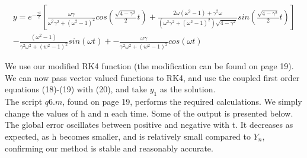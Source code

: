 \documentclass[10pt,a4paper]{report}
\begin{document}
\begin{multline*}
y = e^{-\frac{\gamma t}{2}}\left[\frac{\omega\gamma}{\omega^2\gamma^2+(\omega^2 -1)^2}cos(\frac{\sqrt{4 - \gamma ^2}}{2}t)+\frac{2\omega(\omega^2-1)+\gamma^2\omega}{(\omega^2\gamma^2+(\omega^2 -1)^2)\sqrt{4-\gamma^2}}sin(\frac{\sqrt{4 - \gamma ^2}}{2}t)\right]
\\
-\frac{(\omega^2-1)}{\gamma^2\omega^2+(w^2-1)^2}sin(\omega t) + -\frac{\omega\gamma }{\gamma^2\omega^2+(w^2-1)^2}cos(\omega t)
\end{multline*}

We use our modified RK4 function (the modification can be found on page 19). We can now pass vector valued functions to RK4, and use the coupled first order equations (18)-(19) with (20), and take $y_1$ as the solution. \\

The script $q6.m$, found on page 19, performs the required calculations. We simply change the values of h and n each time. Some of the output is presented below. The global error oscillates between positive and negative with t. It decreases as expected, as h becomes smaller, and is relatively small compared to $Y_n$, confirming our method is stable and reasonably accurate.	\\
\end{document}
